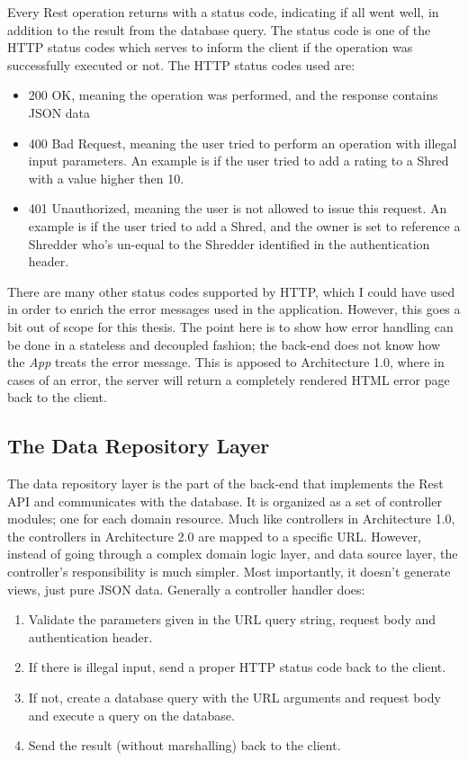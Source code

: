 Every Rest operation returns with a status code, indicating if all went well, in addition to the result from the database query. The status code is one of the HTTP status codes which serves to inform the client if the operation was successfully executed or not. The HTTP status codes used are:
\begin{itemize}
\item{}200 OK, meaning the operation was performed, and the response contains JSON data
\item{} 400 Bad Request, meaning the user tried to perform an operation with illegal input parameters. An example is if the user tried to add a rating to a Shred with a value higher then 10.
\item{} 401 Unauthorized, meaning the user is not allowed to issue this request. An example is if the user tried to add a Shred, and the owner is set to reference a Shredder who's un-equal to the Shredder identified in the authentication header.

\end{itemize}
There are many other status codes supported by HTTP, which I could have used in order to enrich the error messages used in the application. However, this goes a bit out of scope for this thesis. The point here is to show how error handling can be done in a stateless and decoupled fashion; the back-end does not know how the \textit{App} treats the error message. This is apposed to Architecture 1.0, where in cases of an error, the server will return a completely rendered HTML error page back to the client. 

\subsection{The Data Repository Layer}
The data repository layer is the part of the back-end that implements the Rest API and communicates with the database. It is organized as a set of controller modules; one for each domain resource. Much like controllers in Architecture 1.0, the controllers in Architecture 2.0 are mapped to a specific URL. However, instead of going through a complex domain logic layer, and data source layer, the controller's responsibility is much simpler. Most importantly, it doesn't generate views, just pure JSON data. Generally a controller handler does:
\begin{enumerate}
\item{} Validate the parameters given in the URL query string, request body and authentication header.
\item{} If there is illegal input, send a proper HTTP status code back to the client.
\item{} If not, create a database query with the URL arguments and request body and execute a query on the database.
\item{} Send the result (without marshalling) back to the client. 
\end{enumerate}

